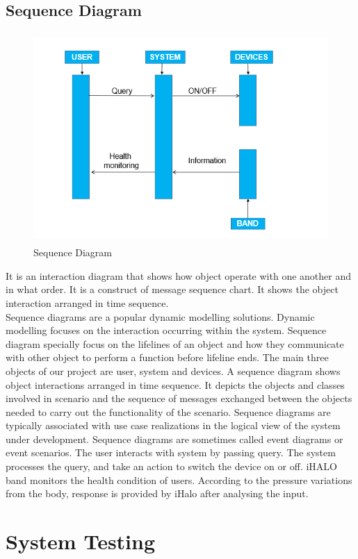 \section{Sequence Diagram}
\begin{figure}[H]
	
	\centering
	\includegraphics[width=\linewidth,height=8cm] {./images/p7.png}
	\caption{Sequence Diagram}
	\label{manual}
\end{figure}
It is an interaction diagram that shows how object operate with one another and in what order. It is a construct of message sequence chart. It shows the object interaction arranged in time sequence.\\
Sequence diagrams are a popular dynamic modelling solutions. Dynamic modelling focuses on the interaction occurring within the system. Sequence diagram specially focus on the lifelines of an object and how they communicate with other object to perform a function before lifeline ends. The main three objects of our project are user, system and devices. A sequence diagram shows object interactions arranged in time sequence. It depicts the objects and classes involved in scenario and the sequence of messages exchanged between the objects needed to carry out the functionality of the scenario. Sequence diagrams are typically associated with use case realizations in the logical view of the system under development. Sequence diagrams are sometimes called event diagrams or event scenarios. The user interacts with system by passing query. The system processes the query, and take an action to switch the device on or off. iHALO band monitors the health condition of users. According to the pressure variations from the body, response is provided by iHalo after analysing the input.
\chapter{System Testing}
\thispagestyle{fancy}
